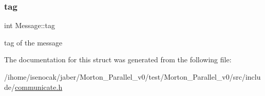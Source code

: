 \subsubsection{\texorpdfstring{tag}{tag}}
{\footnotesize\ttfamily int Message\+::tag}

tag of the message 

The documentation for this struct was generated from the following file\+:\begin{DoxyCompactItemize}
\item 
/ihome/isenocak/jaber/\+Morton\+\_\+\+Parallel\+\_\+v0/test/\+Morton\+\_\+\+Parallel\+\_\+v0/src/include/\mbox{\hyperlink{communicate_8h}{communicate.\+h}}\end{DoxyCompactItemize}
